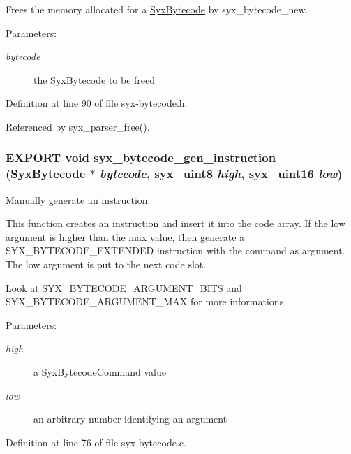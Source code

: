 Frees the memory allocated for a \hyperlink{struct_syx_bytecode}{SyxBytecode} by syx\_\-bytecode\_\-new.

\begin{Desc}
\item[Parameters:]
\begin{description}
\item[{\em bytecode}]the \hyperlink{struct_syx_bytecode}{SyxBytecode} to be freed \end{description}
\end{Desc}


Definition at line 90 of file syx-bytecode.h.

Referenced by syx\_\-parser\_\-free().\hypertarget{syx-bytecode_8h_5377d7f12378a8c64ef0b01d1adbe1b2}{
\subsubsection{\setlength{\rightskip}{0pt plus 5cm}EXPORT void syx\_\-bytecode\_\-gen\_\-instruction ({\bf SyxBytecode} $\ast$ {\em bytecode}, \/  {\bf syx\_\-uint8} {\em high}, \/  {\bf syx\_\-uint16} {\em low})}}
\label{syx-bytecode_8h_5377d7f12378a8c64ef0b01d1adbe1b2}


Manually generate an instruction.

This function creates an instruction and insert it into the code array. If the low argument is higher than the max value, then generate a SYX\_\-BYTECODE\_\-EXTENDED instruction with the command as argument. The low argument is put to the next code slot.

Look at SYX\_\-BYTECODE\_\-ARGUMENT\_\-BITS and SYX\_\-BYTECODE\_\-ARGUMENT\_\-MAX for more informations.

\begin{Desc}
\item[Parameters:]
\begin{description}
\item[{\em high}]a SyxBytecodeCommand value \item[{\em low}]an arbitrary number identifying an argument \end{description}
\end{Desc}


Definition at line 76 of file syx-bytecode.c.

